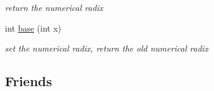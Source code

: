\begin{DoxyCompactItemize}
\begin{DoxyCompactList}\small\item\em return the numerical radix \end{DoxyCompactList}\item 
int \hyperlink{classhwlib_1_1ostream_a0895d45a31d89352d5c167dc0932399b}{base} (int x)\hypertarget{classhwlib_1_1ostream_a0895d45a31d89352d5c167dc0932399b}{}\label{classhwlib_1_1ostream_a0895d45a31d89352d5c167dc0932399b}

\begin{DoxyCompactList}\small\item\em set the numerical radix, return the old numerical radix \end{DoxyCompactList}\end{DoxyCompactItemize}
\subsection*{Friends}
